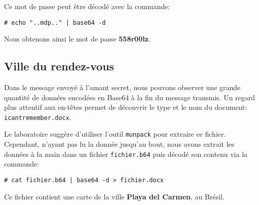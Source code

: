 \documentclass[11pt,a4paper]{article}
\newcommand{\shellcmd}[1]{\texttt{\footnotesize\# #1}}
\begin{document}
Ce mot de passe peut être décodé avec la commande:

\shellcmd{echo "..mdp.." | base64 -d}

Nous obtenons ainsi le mot de passe \textbf{558r00lz}.

\subsection{Ville du rendez-vous}

Dans le message envoyé à l'amant secret, nous pouvons observer une grande quantité de données encodées en Base64 à la fin du message transmis. Un regard plus attentif aux en-têtes permet de découvrir le type et le nom du document: \texttt{icantremember.docx}.

Le laboratoire suggère d'utiliser l'outil \texttt{munpack} pour extraire ce fichier. Cependant, n'ayant pas lu la donnée jusqu'au bout, nous avons extrait les données à la main dans un fichier \texttt{fichier.b64} puis décodé son contenu via la commande:

\shellcmd{cat fichier.b64 | base64 -d > fichier.docx}

Ce fichier contient une carte de la ville \textbf{Playa del Carmen}, au Brésil.
\end{document}
